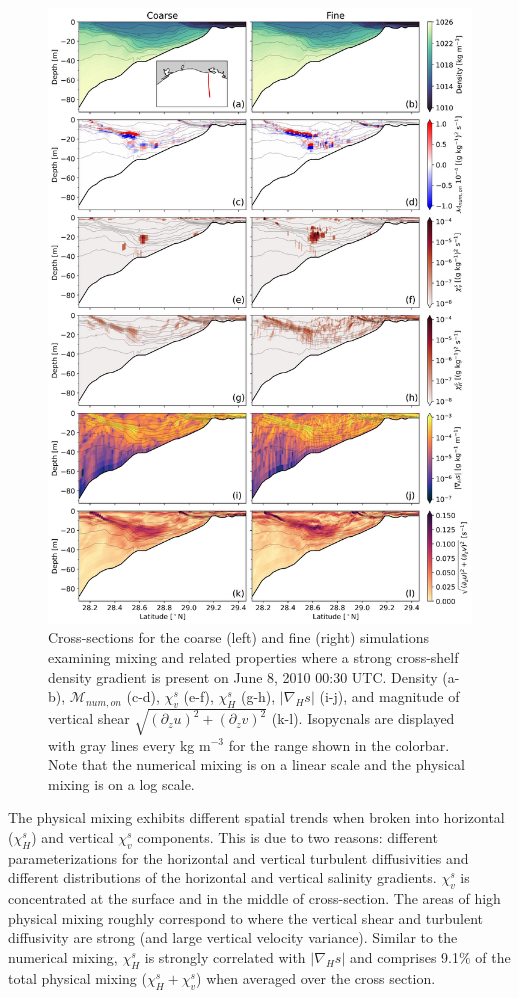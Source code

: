 \begin{figure}
 \centerline{\includegraphics[width = 0.85\linewidth]{figures/james_2023/Figure5_cross_section.jpg}}
  \caption{Cross-sections for the coarse (left) and fine (right) simulations examining mixing and related properties where a strong cross-shelf density gradient is present on June 8, 2010 00:30 UTC. Density (a-b), $\mathcal{M}_{num, on}$ (c-d), $\chi_v^s$ (e-f), $\chi_H^s$ (g-h), $|\nabla_H s|$ (i-j), and magnitude of vertical shear $\sqrt{(\partial_z u)^2+(\partial_z v)^2}$ (k-l). Isopycnals are displayed with gray lines every kg m$^{-3}$ for the range shown in the colorbar. Note that the numerical mixing is on a linear scale and the physical mixing is on a log scale.}
  \label{fig:cross_section}
\end{figure}

The physical mixing exhibits different spatial trends when broken into horizontal ($\chi_H^s$) and vertical $\chi_v^s$ components. This is due to two reasons: different parameterizations for the horizontal and vertical turbulent diffusivities and different distributions of the horizontal and vertical salinity gradients. $\chi_v^s$ is concentrated at the surface and in the middle of cross-section. The areas of high physical mixing roughly correspond to where the vertical shear and turbulent diffusivity are strong (and large vertical velocity variance). Similar to the numerical mixing, $\chi_H^s$ is strongly correlated with $|\nabla_H s|$ and comprises 9.1$\%$ of the total physical mixing ($\chi_H^s+\chi_v^s$) when averaged over the cross section. 

